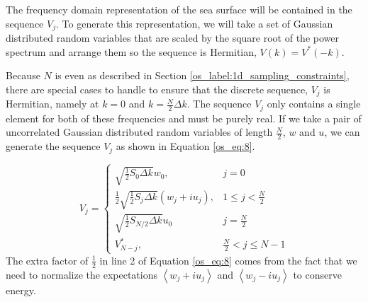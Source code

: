 The frequency domain representation of the sea surface will be contained in the sequence $V_j$. To generate this representation, we will take a set of Gaussian distributed random variables that are scaled  by the square root of the power spectrum and arrange them so the sequence is Hermitian, $V(k) = V^*(-k)$.

Because $N$ is even as described in Section \ref{os_label:1d_sampling_constraints}, there are special cases to handle to ensure that the discrete sequence, $V_j$ is Hermitian, namely at $k = 0$ and $k = \frac{N}{2}\Delta k$. The sequence $V_j$ only contains a single element for both of these frequencies and must be purely real. If we take a pair of uncorrelated Gaussian distributed random variables of length $\frac{N}{2}$, $w$ and $u$, we can generate the sequence $V_j$ as shown in Equation \ref{os_eq:8}.

\begin{equation}
  \label{os_eq:8}   
  V_j = \begin{cases}
    \sqrt{\frac{1}{2}S_0\Delta k}w_0, & j = 0 \\
    \frac{1}{2}\sqrt{\frac{1}{2}S_j\Delta k}\left(w_j + iu_j \right), & 1 \leq j < \frac{N}{2} \\
   \sqrt{\frac{1}{2}S_{N/2}\Delta k}u_0 & j = \frac{N}{2} \\
    V_{N-j}^*, &  \frac{N}{2} < j \leq N-1 
  \end{cases} 
\end{equation}
The extra factor of $\frac{1}{2}$ in line 2 of Equation \ref{os_eq:8} comes from the fact that we need to normalize the expectations $\left<w_j + iu_j\right>$ and $\left<w_j - iu_j\right>$ to conserve energy.

